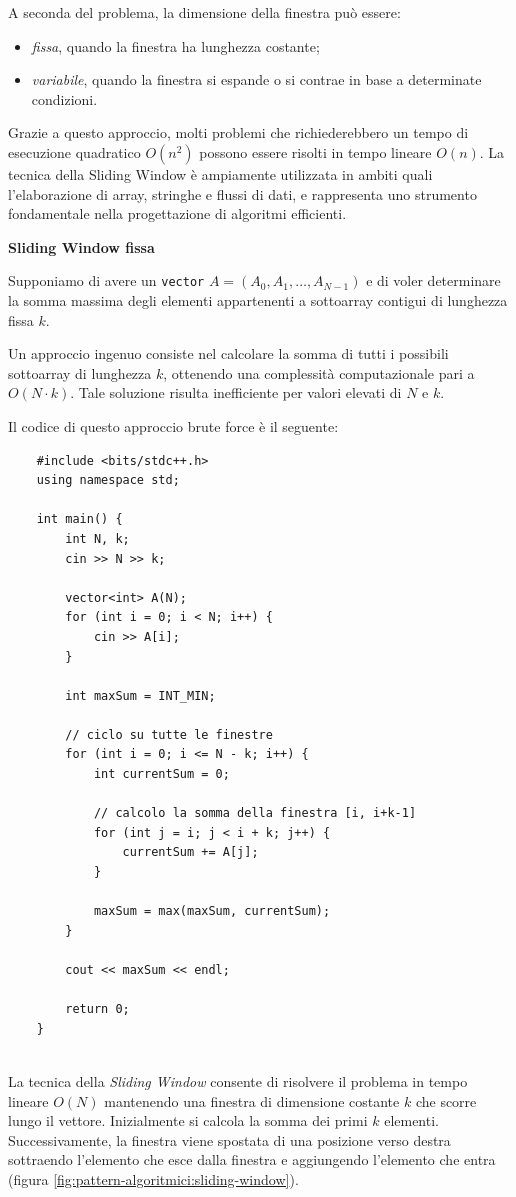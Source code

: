 A seconda del problema, la dimensione della finestra può essere:
\begin{itemize}
	\item \textit{fissa}, quando la finestra ha lunghezza costante;
	\item \textit{variabile}, quando la finestra si espande o si contrae in base a determinate condizioni.
\end{itemize}

Grazie a questo approccio, molti problemi che richiederebbero un tempo di esecuzione quadratico $O(n^2)$ possono essere risolti in tempo lineare $O(n)$.  
La tecnica della Sliding Window è ampiamente utilizzata in ambiti quali l’elaborazione di array, stringhe e flussi di dati, e rappresenta uno strumento fondamentale nella progettazione di algoritmi efficienti.

\newpage
\noindent \textbf{Sliding Window fissa} 
\medskip

Supponiamo di avere un \texttt{vector} $A = (A_0, A_1, \dots, A_{N-1})$ e di voler determinare la somma massima degli elementi appartenenti a sottoarray contigui di lunghezza fissa $k$.

Un approccio ingenuo consiste nel calcolare la somma di tutti i possibili sottoarray di lunghezza $k$, ottenendo una complessità computazionale pari a $O(N \cdot k)$.  
Tale soluzione risulta inefficiente per valori elevati di $N$ e $k$.

Il codice di questo approccio brute force è il seguente:

\begin{lstlisting}
	#include <bits/stdc++.h>
	using namespace std;
	
	int main() {
		int N, k;
		cin >> N >> k;
		
		vector<int> A(N);
		for (int i = 0; i < N; i++) {
			cin >> A[i];
		}
		
		int maxSum = INT_MIN;
		
		// ciclo su tutte le finestre
		for (int i = 0; i <= N - k; i++) {
			int currentSum = 0;
			
			// calcolo la somma della finestra [i, i+k-1]
			for (int j = i; j < i + k; j++) {
				currentSum += A[j];
			}
			
			maxSum = max(maxSum, currentSum);
		}
		
		cout << maxSum << endl;
		
		return 0;
	}
	
\end{lstlisting}

La tecnica della \textit{Sliding Window} consente di risolvere il problema in tempo lineare $O(N)$ mantenendo una finestra di dimensione costante $k$ che scorre lungo il vettore.  
Inizialmente si calcola la somma dei primi $k$ elementi. Successivamente, la finestra viene spostata di una posizione verso destra sottraendo l’elemento che esce dalla finestra e aggiungendo l’elemento che entra (figura \ref{fig:pattern-algoritmici:sliding-window}).





